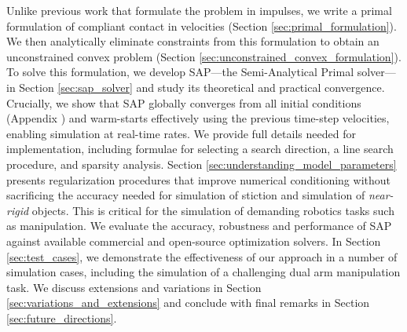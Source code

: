 Unlike previous work \cite{bib:anitescu2010,bib:todorov2014} that formulate the
problem in impulses, we write a primal formulation of compliant contact
in velocities (Section \ref{sec:primal_formulation}). We then analytically eliminate constraints from this
formulation to obtain an unconstrained convex problem (Section \ref{sec:unconstrained_convex_formulation}).
To solve this formulation, we develop SAP---the Semi-Analytical Primal  solver---in Section \ref{sec:sap_solver} and study its theoretical and practical
 convergence.  Crucially, we show that SAP globally converges from all initial conditions (Appendix ) and warm-starts effectively
using the previous time-step velocities, enabling simulation at real-time rates.  We provide full details needed for implementation,
including formulae for selecting a search direction,
a line search procedure, and sparsity analysis. Section
\ref{sec:understanding_model_parameters} presents 
 regularization procedures that improve numerical
 conditioning without sacrificing the accuracy needed
 for simulation of stiction and simulation of \emph{near-rigid} objects.
This is critical for the simulation of demanding robotics tasks such as
manipulation. We evaluate the accuracy, robustness and performance of SAP
against available commercial and open-source optimization solvers. In Section
\ref{sec:test_cases}, we demonstrate the effectiveness of our approach in a
number of simulation cases, including the simulation of a challenging dual arm
manipulation task. We discuss extensions and variations in Section
\ref{sec:variations_and_extensions} and conclude with final remarks in Section
\ref{sec:future_directions}.
